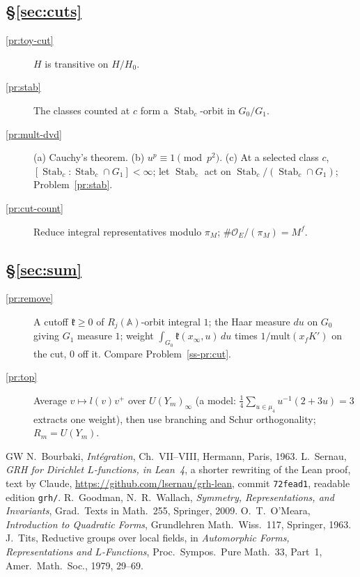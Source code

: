 \documentclass[reqno]{amsart}
\theoremstyle{definition}
\theoremstyle{plain}
\theoremstyle{remark}
\newcommand{\A}{\mathbb{A}}
\newcommand{\Oc}{\mathcal{O}}
\newcommand{\mult}{\mathrm{mult}}
\newcommand{\Stab}{\operatorname{Stab}}
\begin{document}
\subsection*{\S\ref{sec:cuts}}
\begin{description}
\item[\ref{pr:toy-cut}] \(H\) is transitive on \(H/H_0\).
\item[\ref{pr:stab}] The classes counted at \(c\) form a \(\Stab_c\)-orbit in \(G_0/G_1\).
\item[\ref{pr:mult-dvd}] (a) Cauchy's theorem.  (b) \(u^p\equiv1\pmod{p^2}\).  (c) At a selected class \(c\), \([\Stab_c:\Stab_c\cap G_1]<\infty\); let \(\Stab_c\) act on \(\Stab_c/(\Stab_c\cap G_1)\); Problem~\ref{pr:stab}.
\item[\ref{pr:cut-count}] Reduce integral representatives modulo \(\pi_M\); \(\#\Oc_E/(\pi_M)=M^f\).
\end{description}

\subsection*{\S\ref{sec:sum}}
\begin{description}
\item[\ref{pr:remove}] A cutoff \(\mathfrak k\ge0\) of \(R_j(\A)\)-orbit integral \(1\); the Haar measure \(du\) on \(G_0\) giving \(G_1\) measure \(1\); weight \(\int_{G_0}\mathfrak k(x_\infty,u)\,du\) times \(1/\mult(x_fK')\) on the cut, \(0\) off it.  Compare Problem~\ref{ss-pr:cut}.
\item[\ref{pr:top}] Average \(v\mapsto l(v)v^+\) over \(U(Y_m)_\infty\) (a model: \(\frac14\sum_{u\in\mu_4}u^{-1}(2+3u)=3\) extracts one weight), then use branching and Schur orthogonality; \(R_m=U(Y_m)\).
\end{description}

\begin{thebibliography}{GW}
 N.~Bourbaki, \emph{Int\'egration}, Ch.~VII--VIII, Hermann, Paris, 1963.
 L.~Sernau, \emph{GRH for Dirichlet \(L\)-functions, in Lean~4}, a shorter rewriting of the Lean proof, text by Claude, \url{https://github.com/lsernau/grh-lean}, commit \texttt{72fead1}, readable edition \texttt{grh/}.
 R.~Goodman, N.~R.~Wallach, \emph{Symmetry, Representations, and Invariants}, Grad.\ Texts in Math.\ 255, Springer, 2009.
 O.~T.~O'Meara, \emph{Introduction to Quadratic Forms}, Grundlehren Math.\ Wiss.\ 117, Springer, 1963.
 J.~Tits, Reductive groups over local fields, in \emph{Automorphic Forms, Representations and \(L\)-Functions}, Proc.\ Sympos.\ Pure Math.\ 33, Part~1, Amer.\ Math.\ Soc., 1979, 29--69.
\end{thebibliography}
\end{document}
